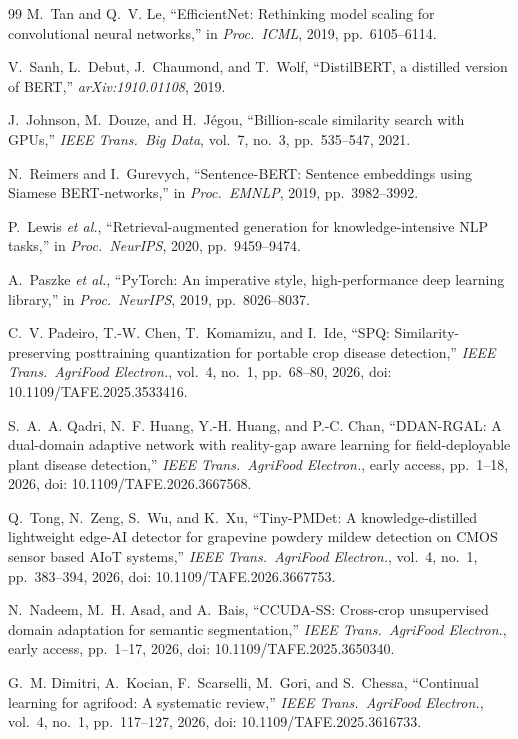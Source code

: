 \documentclass[conference]{IEEEtran}
\begin{document}
\begin{thebibliography}{99}
M.~Tan and Q.~V. Le, ``EfficientNet: Rethinking model scaling for convolutional
neural networks,'' in \emph{Proc.\ ICML}, 2019, pp.~6105--6114.

V.~Sanh, L.~Debut, J.~Chaumond, and T.~Wolf, ``DistilBERT, a distilled version of
BERT,'' \emph{arXiv:1910.01108}, 2019.

J.~Johnson, M.~Douze, and H.~J\'{e}gou, ``Billion-scale similarity search with
{GPUs},'' \emph{IEEE Trans.\ Big Data}, vol.~7, no.~3, pp.~535--547, 2021.

N.~Reimers and I.~Gurevych, ``Sentence-BERT: Sentence embeddings using Siamese
BERT-networks,'' in \emph{Proc.\ EMNLP}, 2019, pp.~3982--3992.

P.~Lewis \emph{et al.}, ``Retrieval-augmented generation for knowledge-intensive
{NLP} tasks,'' in \emph{Proc.\ NeurIPS}, 2020, pp.~9459--9474.

A.~Paszke \emph{et al.}, ``PyTorch: An imperative style, high-performance deep
learning library,'' in \emph{Proc.\ NeurIPS}, 2019, pp.~8026--8037.

C.~V. Padeiro, T.-W. Chen, T.~Komamizu, and I.~Ide, ``SPQ:
Similarity-preserving posttraining quantization for portable crop disease
detection,'' \emph{IEEE Trans.\ AgriFood Electron.}, vol.~4, no.~1,
pp.~68--80, 2026, doi: 10.1109/TAFE.2025.3533416.

S.~A.~A. Qadri, N.~F. Huang, Y.-H. Huang, and P.-C. Chan, ``DDAN-RGAL: A
dual-domain adaptive network with reality-gap aware learning for
field-deployable plant disease detection,'' \emph{IEEE Trans.\ AgriFood
Electron.}, early access, pp.~1--18, 2026, doi: 10.1109/TAFE.2026.3667568.

Q.~Tong, N.~Zeng, S.~Wu, and K.~Xu, ``Tiny-PMDet: A knowledge-distilled
lightweight edge-AI detector for grapevine powdery mildew detection on CMOS
sensor based AIoT systems,'' \emph{IEEE Trans.\ AgriFood Electron.}, vol.~4,
no.~1, pp.~383--394, 2026, doi: 10.1109/TAFE.2026.3667753.

N.~Nadeem, M.~H. Asad, and A.~Bais, ``CCUDA-SS: Cross-crop unsupervised domain
adaptation for semantic segmentation,'' \emph{IEEE Trans.\ AgriFood Electron.},
early access, pp.~1--17, 2026, doi: 10.1109/TAFE.2025.3650340.

G.~M. Dimitri, A.~Kocian, F.~Scarselli, M.~Gori, and S.~Chessa, ``Continual
learning for agrifood: A systematic review,'' \emph{IEEE Trans.\ AgriFood
Electron.}, vol.~4, no.~1, pp.~117--127, 2026, doi:
10.1109/TAFE.2025.3616733.


\end{thebibliography}
\end{document}
